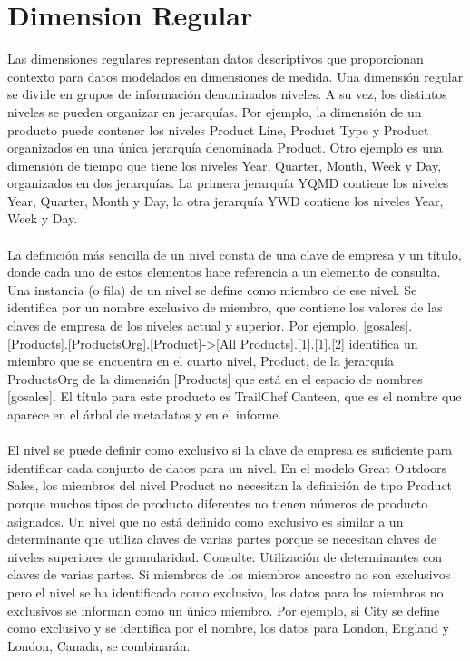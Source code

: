\documentclass[12pt,letterpaper]{article}
\begin{document}
\section{Dimension Regular }
Las dimensiones regulares representan datos descriptivos que proporcionan contexto para datos modelados en dimensiones de medida. Una dimensión regular se divide en grupos de información denominados niveles. A su vez, los distintos niveles se pueden organizar en jerarquías. Por ejemplo, la dimensión de un producto puede contener los niveles Product Line, Product Type y Product organizados en una única jerarquía denominada Product. Otro ejemplo es una dimensión de tiempo que tiene los niveles Year, Quarter, Month, Week y Day, organizados en dos jerarquías. La primera jerarquía YQMD contiene los niveles Year, Quarter, Month y Day, la otra jerarquía YWD contiene los niveles Year, Week y Day.
\\
\\
La definición más sencilla de un nivel consta de una clave de empresa y un título, donde cada uno de estos elementos hace referencia a un elemento de consulta. Una instancia (o fila) de un nivel se define como miembro de ese nivel. Se identifica por un nombre exclusivo de miembro, que contiene los valores de las claves de empresa de los niveles actual y superior. Por ejemplo, [gosales].[Products].[ProductsOrg].[Product]->[All Products].[1].[1].[2] identifica un miembro que se encuentra en el cuarto nivel, Product, de la jerarquía ProductsOrg de la dimensión [Products] que está en el espacio de nombres [gosales]. El título para este producto es TrailChef Canteen, que es el nombre que aparece en el árbol de metadatos y en el informe.
\\
\\
El nivel se puede definir como exclusivo si la clave de empresa es suficiente para identificar cada conjunto de datos para un nivel. En el modelo Great Outdoors Sales, los miembros del nivel Product no necesitan la definición de tipo Product porque muchos tipos de producto diferentes no tienen números de producto asignados. Un nivel que no está definido como exclusivo es similar a un determinante que utiliza claves de varias partes porque se necesitan claves de niveles superiores de granularidad. Consulte: Utilización de determinantes con claves de varias partes. Si miembros de los miembros ancestro no son exclusivos pero el nivel se ha identificado como exclusivo, los datos para los miembros no exclusivos se informan como un único miembro. Por ejemplo, si City se define como exclusivo y se identifica por el nombre, los datos para London, England y London, Canada, se combinarán.
\end{document}

